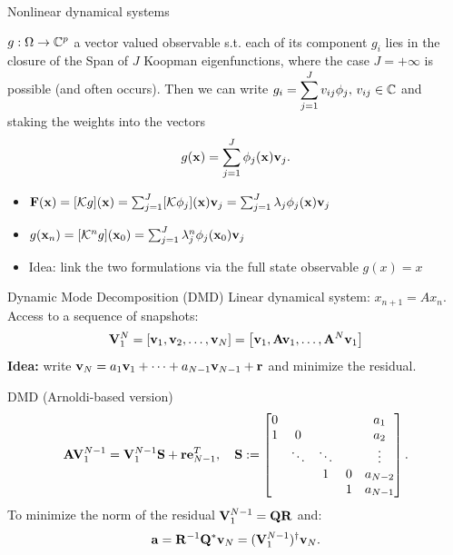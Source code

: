 \documentclass{beamer}
\begin{document}
\begin{frame}[fragile]{Nonlinear dynamical systems}
\begin{definition}
$g:\Omega\to\mathbb{C}^p$ a vector valued observable s.t. each of its component $g_i$ lies in the closure of the Span of $J$ Koopman eigenfunctions, where the case $J=+\infty$ is possible (and often occurs). Then we can write $\displaystyle{g_i = \sum_{j = 1}^J v_{ij}\phi_j, \, v_{ij}\in\mathbb{C}}$ and staking the weights into the vectors 
\begin{equation*}
    \label{koopman_modes}
	g(\vb{x}) = \sum_{j = 1}^J \phi_j(\vb{x})\vb{v}_{j}.
\end{equation*}
\end{definition}
\begin{itemize}
    \item $\vb{F}(\vb{x}) = [\mathcal{K}g](\vb{x}) = \sum_{j = 1}^J [\mathcal{K}\phi_j](\vb{x})\vb{v}_j = \sum_{j = 1}^J \lambda_j\phi_j(\vb{x})\vb{v}_j$
    \item $g(\vb{x}_n) = [\mathcal{K}^ng](\vb{x}_0) = \sum_{j = 1}^J \lambda_j^n\phi_j(\vb{x}_0)\vb{v}_{j}$ 
    \item Idea: link the two formulations via the full state observable $g(x) = x$
\end{itemize}
\end{frame}

\begin{frame}[fragile]{Dynamic Mode Decomposition (DMD)}
Linear dynamical system: $x_{n+1} = Ax_n$. Access to a sequence of snapshots:
\begin{equation*}
    \vb{V}_1^N = \left[\vb{v}_1, \vb{v}_2, \dots, \vb{v}_N\right] = \left[\vb{v}_1, \vb{A}\vb{v}_1, \dots, \vb{A}^N\vb{v}_1\right]
\end{equation*}
\alert{\textbf{Idea:}} write $\vb{v}_N = a_1 \vb{v}_1 + \dots + a_{N-1} \vb{v}_{N-1} + \vb{r}$ and minimize the residual.
\begin{block}{DMD (Arnoldi-based version)}
\begin{equation*}
    \vb{A}\vb{V}_1^{N-1}  = \vb{V}_1^{N-1}\vb{S} + \vb{r}\vb{e}_{N-1}^T, \quad 
    \vb{S} :=
   \begin{bmatrix}
   0     &        &       &      & a_1 \\
   1     & 0      &       &      & a_2 \\
         & \ddots & \ddots&      & \vdots \\ 
         &        & 1     & 0    & a_{N-2} \\
         &        &       & 1    & a_{N-1} \\
   \end{bmatrix}.
\end{equation*}
To minimize the norm of the residual $\vb{V}_1^{N-1} = \vb{Q}\vb{R}$ and:
\begin{equation*}
    \vb{a} = \vb{R}^{-1} \vb{Q}^*\vb{v}_N = (\vb{V}_1^{N-1})^{\dagger}\vb{v}_N.
\end{equation*}
\end{block}
\end{frame}
\end{document}

